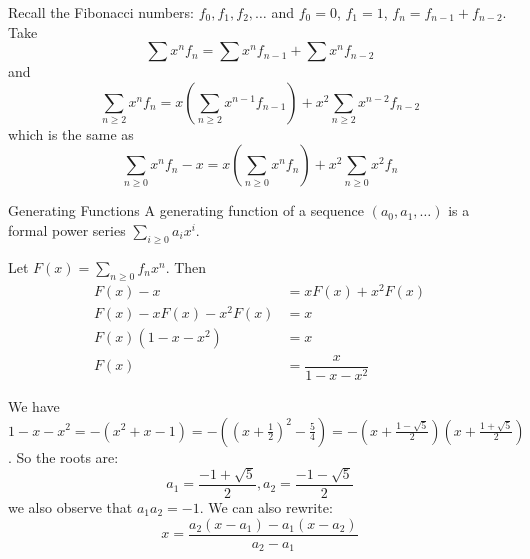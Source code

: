 \documentclass{report}
\begin{document}
Recall the Fibonacci numbers: $f_{0}, f_{1}, f_{2}, \ldots $ and $f_{0} = 0$, $f_{1} = 1$, $f_{n} = f_{n - 1} + f_{n - 2}$. Take 
    \begin{equation*}
        \sum x^{n}f_{n} = \sum x^{n}f_{n - 1} + \sum x^{n}f_{n - 2}
    \end{equation*}
and
    \begin{equation*}
        \sum_{n \geq 2}x^{n}f_{n} = x\left(\sum_{n \geq 2}x^{n - 1}f_{n - 1}\right) + x^{2}\sum_{n \geq 2}x^{n - 2}f_{n - 2}
    \end{equation*}
which is the same as
    \begin{equation*}
        \sum_{n \geq 0}x^{n}f_{n} - x = x\left(\sum_{n \geq 0}x^{n}f_{n}\right) + x^{2}\sum_{n \geq 0}x^{2}f_{n}
    \end{equation*}

\begin{definition}{Generating Functions}
    A generating function of a sequence $(a_{0}, a_{1}, \ldots )$ is a formal power series $\sum_{i \geq 0} a_{i}x^{i}$.
\end{definition}

Let $F(x) = \sum_{n \geq 0}f_{n}x^{n}$. Then
    \begin{align*}
        F(x) - x &= xF(x) + x^{2}F(x) \\ 
        F(x) - xF(x) - x^{2}F(x) &= x \\
        F(x)(1 - x - x^{2}) &= x \\
        F(x) &= \dfrac{x}{1 - x - x^{2}}
    \end{align*}

We have $1 - x - x^{2} = -(x^{2} + x - 1) = -((x + \frac{1}{2})^{2} - \frac{5}{4}) = -(x + \frac{1 - \sqrt{5}}{2})(x + \frac{1 + \sqrt{5}}{2})$. So the roots are:
    \begin{equation*}
        a_{1} = \dfrac{-1 + \sqrt{5}}{2}, a_{2} = \dfrac{-1  - \sqrt{5}}{2}
    \end{equation*}
we also observe that $a_{1}a_{2} = -1$. We can also rewrite:
    \begin{equation*}
        x = \dfrac{a_2(x - a_{1}) - a_{1}(x - a_{2})}{a_{2} - a_{1}}
    \end{equation*}
\end{document}
